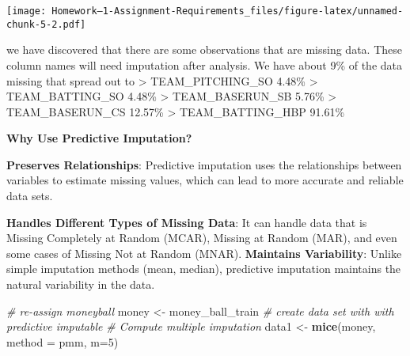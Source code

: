 \documentclass[
]{article}
\newenvironment{Shaded}{\begin{snugshade}}{\end{snugshade}}
\newcommand{\AttributeTok}[1]{\textcolor[rgb]{0.13,0.29,0.53}{#1}}
\newcommand{\CommentTok}[1]{\textcolor[rgb]{0.56,0.35,0.01}{\textit{#1}}}
\newcommand{\DecValTok}[1]{\textcolor[rgb]{0.00,0.00,0.81}{#1}}
\newcommand{\FunctionTok}[1]{\textcolor[rgb]{0.13,0.29,0.53}{\textbf{#1}}}
\newcommand{\NormalTok}[1]{#1}
\newcommand{\OtherTok}[1]{\textcolor[rgb]{0.56,0.35,0.01}{#1}}
\newcommand{\StringTok}[1]{\textcolor[rgb]{0.31,0.60,0.02}{#1}}
\begin{document}
\texttt{[image: Homework--1-Assignment-Requirements\_files/figure-latex/unnamed-chunk-5-2.pdf]}

we have discovered that there are some observations that are missing
data. These column names will need imputation after analysis. We have
about 9\% of the data missing that spread out to \textgreater{}
TEAM\_PITCHING\_SO 4.48\% \textgreater{} TEAM\_BATTING\_SO 4.48\%
\textgreater{} TEAM\_BASERUN\_SB 5.76\% \textgreater{} TEAM\_BASERUN\_CS
12.57\% \textgreater{} TEAM\_BATTING\_HBP 91.61\%

\textbf{Why Use Predictive Imputation?}

\textbf{Preserves Relationships}: Predictive imputation uses the
relationships between variables to estimate missing values, which can
lead to more accurate and reliable data sets.

\textbf{Handles Different Types of Missing Data}: It can handle data
that is Missing Completely at Random (MCAR), Missing at Random (MAR),
and even some cases of Missing Not at Random (MNAR). \textbf{Maintains
Variability}: Unlike simple imputation methods (mean, median),
predictive imputation maintains the natural variability in the data.

\begin{Shaded}
\begin{Highlighting}[]
\CommentTok{\# re{-}assign moneyball}
\NormalTok{money }\OtherTok{\textless{}{-}}\NormalTok{ money\_ball\_train}
\CommentTok{\# create data set with with predictive imputable }
\CommentTok{\# Compute multiple imputation }
\NormalTok{data1 }\OtherTok{\textless{}{-}} \FunctionTok{mice}\NormalTok{(money, }\AttributeTok{method =} \StringTok{\textquotesingle{}pmm\textquotesingle{}}\NormalTok{, }\AttributeTok{m=}\DecValTok{5}\NormalTok{)}
\end{Highlighting}
\end{Shaded}
\end{document}
